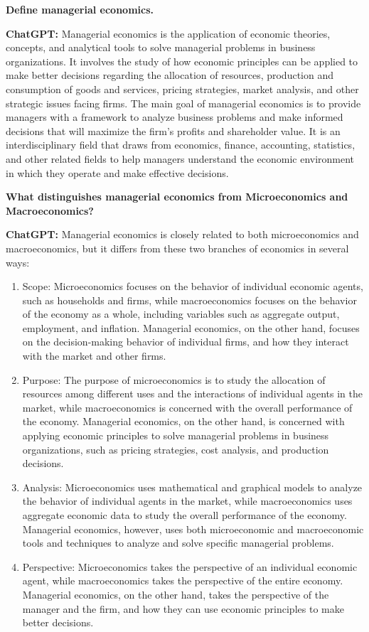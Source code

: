 \documentclass[
  12pt,
  oneside]{book}
\theoremstyle{definition}
\theoremstyle{definition}
\theoremstyle{definition}
\theoremstyle{definition}
\theoremstyle{remark}
\begin{document}
\textbf{Define managerial economics.}

\textbf{ChatGPT:} Managerial economics is the application of economic theories, concepts, and analytical tools to solve managerial problems in business organizations. It involves the study of how economic principles can be applied to make better decisions regarding the allocation of resources, production and consumption of goods and services, pricing strategies, market analysis, and other strategic issues facing firms. The main goal of managerial economics is to provide managers with a framework to analyze business problems and make informed decisions that will maximize the firm's profits and shareholder value. It is an interdisciplinary field that draws from economics, finance, accounting, statistics, and other related fields to help managers understand the economic environment in which they operate and make effective decisions.

\textbf{What distinguishes managerial economics from Microeconomics and Macroeconomics?}

\textbf{ChatGPT:} Managerial economics is closely related to both microeconomics and macroeconomics, but it differs from these two branches of economics in several ways:

\begin{enumerate}
\def\labelenumi{\arabic{enumi}.}
\item
  Scope: Microeconomics focuses on the behavior of individual economic agents, such as households and firms, while macroeconomics focuses on the behavior of the economy as a whole, including variables such as aggregate output, employment, and inflation. Managerial economics, on the other hand, focuses on the decision-making behavior of individual firms, and how they interact with the market and other firms.
\item
  Purpose: The purpose of microeconomics is to study the allocation of resources among different uses and the interactions of individual agents in the market, while macroeconomics is concerned with the overall performance of the economy. Managerial economics, on the other hand, is concerned with applying economic principles to solve managerial problems in business organizations, such as pricing strategies, cost analysis, and production decisions.
\item
  Analysis: Microeconomics uses mathematical and graphical models to analyze the behavior of individual agents in the market, while macroeconomics uses aggregate economic data to study the overall performance of the economy. Managerial economics, however, uses both microeconomic and macroeconomic tools and techniques to analyze and solve specific managerial problems.
\item
  Perspective: Microeconomics takes the perspective of an individual economic agent, while macroeconomics takes the perspective of the entire economy. Managerial economics, on the other hand, takes the perspective of the manager and the firm, and how they can use economic principles to make better decisions.
\end{enumerate}
\end{document}
